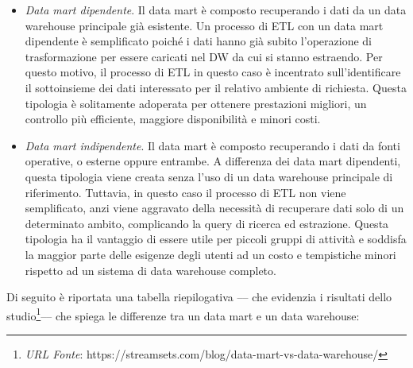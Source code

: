 \begin{itemize}
    \item \textit{Data mart dipendente}. Il data mart è composto recuperando i dati da un data warehouse principale già esistente. Un processo di ETL con un data mart dipendente è semplificato poiché i dati hanno già subito l'operazione di trasformazione per essere caricati nel DW da cui si stanno estraendo. Per questo motivo, il processo di ETL in questo caso è incentrato sull'identificare il sottoinsieme dei dati interessato per il relativo ambiente di richiesta. Questa tipologia è solitamente adoperata per ottenere prestazioni migliori, un controllo più efficiente, maggiore disponibilità e minori costi.
    \item \textit{Data mart indipendente}. Il data mart è composto recuperando i dati da fonti operative, o esterne oppure entrambe. A differenza dei data mart dipendenti, questa tipologia viene creata senza l'uso di un data warehouse principale di riferimento. Tuttavia, in questo caso il processo di ETL non viene semplificato, anzi viene aggravato della necessità di recuperare dati solo di un determinato ambito, complicando la query di ricerca ed estrazione. Questa tipologia ha il vantaggio di essere utile per piccoli gruppi di attività e soddisfa la maggior parte delle esigenze degli utenti ad un costo e tempistiche minori rispetto ad un sistema di data warehouse completo.
\end{itemize}

Di seguito è riportata una tabella riepilogativa –– che evidenzia i risultati dello studio\footnote{\textit{URL Fonte}: https://streamsets.com/blog/data-mart-vs-data-warehouse/}––  che spiega le differenze tra un data mart e un data warehouse:


